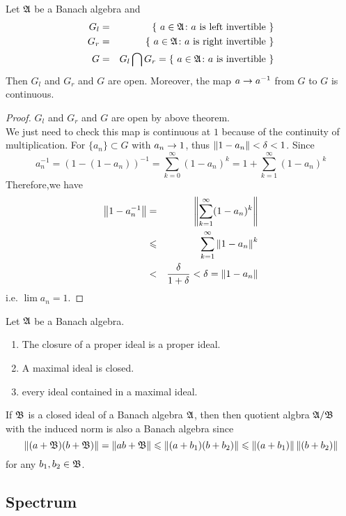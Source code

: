 \documentclass[a4paper,11pt]{report}
\begin{document}
\begin{cor}
	Let $\mathfrak{A}$ be a Banach algebra and 
	\begin{eqnarray*}
		G_l &=& \{~a \in \mathfrak{A} \colon a \text{ is left invertible}~\}\\
		G_r &=& \{~a \in \mathfrak{A} \colon a \text{ is right invertible}~\}\\
		G &=& G_l \bigcap G_r = \{~a \in \mathfrak{A} \colon a \text{ is invertible}~\}
	\end{eqnarray*}
	Then $G_l$ and $G_r$ and $G$ are open. Moreover, the map $a \rightarrow a^{-1}$ from $G$ to $G$ is continuous.
\end{cor}
\begin{proof}
	$G_l$ and $G_r$ and $G$ are open by above theorem. \\
	We just need to check this map is continuous at $1$ because of the continuity of multiplication. For $\{a_n\} \subset G$ with $a_n \rightarrow 1$, thus $\left\lVert1-a_n\right\lVert<\delta<1$. Since
	\begin{equation*}
		a_n^{-1} = (1-(1-a_n))^{-1} = \sum_{k=0}^{\infty} (1-a_n)^{k} = 1+ \sum_{k=1}^{\infty} (1-a_n)^{k}
	\end{equation*}
	Therefore,we have
	\begin{eqnarray*}
		\left\lVert1-a_n^{-1}\right\lVert &=& \left\lVert\sum_{k=1}^{\infty} (1-a_n)^{k}\right\lVert\\
		&\leqslant&  \sum_{k=1}^{\infty} \left\lVert1-a_n\right\lVert^{k}\\
		&<& \frac{\delta}{1+\delta} < \delta = \left\lVert1-a_n\right\lVert
	\end{eqnarray*}
	i.e. $\lim a_n = 1$.
\end{proof}

\begin{cor}
	Let $\mathfrak{A}$ be a Banach algebra.
	\begin{enumerate}[label=\arabic*)]
		\item The closure of a proper ideal is a proper ideal.
		\item A maximal ideal is closed.
		\item every ideal contained in a maximal ideal.
	\end{enumerate}
\end{cor}

If $\mathfrak{B}$ is a closed ideal of a Banach algebra $\mathfrak{A}$, then then quotient algbra $\mathfrak{A}/\mathfrak{B}$ with the induced norm is also a Banach algebra since 
\begin{equation*}
	\left\lVert(a+\mathfrak{B})(b+\mathfrak{B})\right\lVert = \left\lVert ab+\mathfrak{B}\right\lVert \leqslant \left\lVert(a+b_1)(b+b_2)\right\lVert \leqslant \left\lVert(a+b_1)\right\lVert\left\lVert(b+b_2)\right\lVert
\end{equation*}
for any $b_1, b_2 \in \mathfrak{B}$.

\subsection{Spectrum}
\end{document}
